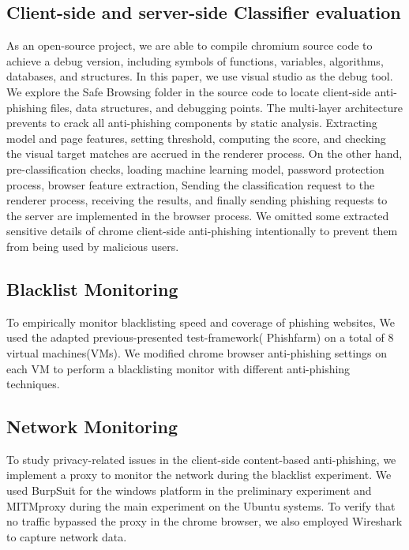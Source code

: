 \subsection{Client-side and server-side Classifier evaluation}

As an open-source project, we are able to compile chromium source code to achieve a debug version, including symbols of functions, variables, algorithms, databases, and structures. In this paper, we use visual studio as the debug tool. We explore the Safe Browsing folder in the source code to locate client-side anti-phishing files, data structures, and debugging points. 
The multi-layer architecture prevents to crack all anti-phishing components by static analysis. Extracting model and page features, setting threshold, computing the score, and checking the visual target matches are accrued in the renderer process. On the other hand, pre-classification checks, loading machine learning model, password protection process, browser feature extraction, Sending the classification request to the renderer process, receiving the results, and finally sending phishing requests to the server are implemented in the browser process.
We omitted some extracted sensitive details of chrome client-side anti-phishing intentionally to prevent them from being used by malicious users. 

\subsection{Blacklist Monitoring}

To empirically monitor blacklisting speed and coverage
of phishing websites, We used the adapted previous-presented test-framework( Phishfarm) \cite{oest2019phishfarm} on a total of 8 virtual machines(VMs). We modified chrome browser anti-phishing settings on each VM to perform a blacklisting monitor with different anti-phishing techniques.

\subsection{Network Monitoring}

To study privacy-related issues in the client-side content-based anti-phishing, we implement a proxy to monitor the network during the blacklist experiment. We used BurpSuit for the windows platform in the preliminary experiment and MITMproxy during the main experiment on the Ubuntu systems. To verify that no traffic bypassed the proxy in the chrome browser, we also employed Wireshark to capture network data.
 
